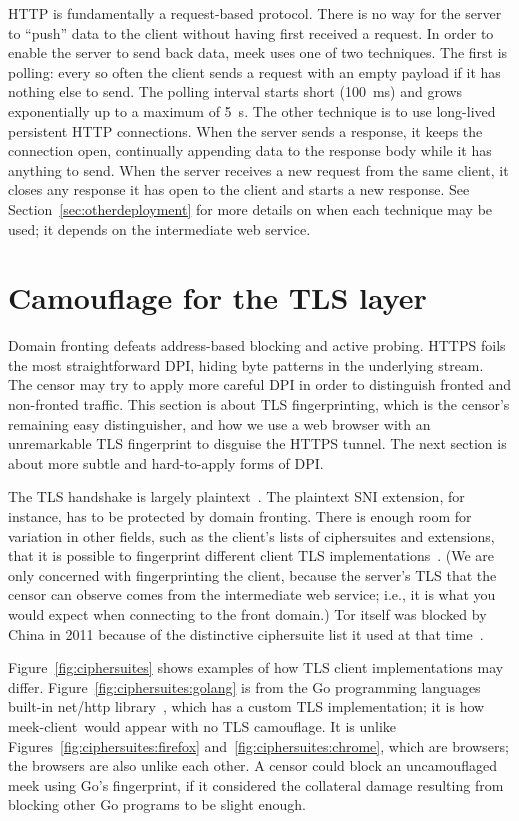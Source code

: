 \documentclass[conference]{IEEEtran}
\def\meekclient{\mbox{meek-client}}
\begin{document}
HTTP is fundamentally a request-based protocol.
There is no way for the server to ``push'' data to the client without
having first received a request.
In order to enable the server to send back data,
meek uses one of two techniques.
The first is polling:
every so often the client sends a request with an empty payload
if it has nothing else to send.
The polling interval starts short (100~ms) and grows exponentially
up to a maximum of 5~s.
The other technique is to use
long-lived persistent HTTP connections.
When the server sends a response, it keeps the connection open,
continually appending data to the response body while it has anything to send.
When the server receives a new request from the same client,
it closes any response it has open to the client and starts a new response.
See Section~\ref{sec:otherdeployment} for more details
on when each technique may be used;
it depends on the intermediate web service.

\section{Camouflage for the TLS layer}
\label{sec:browserextension}

Domain fronting defeats address-based blocking and active probing.
HTTPS foils the most straightforward DPI,
hiding byte patterns in the underlying stream.
The censor may try to apply more careful DPI in order to
distinguish fronted and non-fronted traffic.
This section is about TLS fingerprinting,
which is the censor's remaining easy distinguisher,
and how we use a web browser with an unremarkable TLS fingerprint
to disguise the HTTPS tunnel.
The next section is about more subtle and hard-to-apply forms of DPI.

The TLS handshake is largely plaintext~\cite[Section~7.4]{rfc5246}.
The plaintext SNI extension, for instance, has to be protected by domain fronting.
There is enough room for variation in other fields,
such as the client's lists of ciphersuites and extensions,
that it is possible to fingerprint different client TLS implementations~\cite{ssl-p0f}.
(We are only concerned with fingerprinting the client,
because the server's TLS that the censor can observe
comes from the intermediate web service;
i.e., it is what you would expect when connecting to the front domain.)
Tor itself was blocked by China in 2011
because of the distinctive ciphersuite list it used at that time~\cite{bug4744}.

Figure~\ref{fig:ciphersuites} shows examples of how TLS client
implementations may differ.
Figure~\ref{fig:ciphersuites:golang} is from the Go programming languages
built-in net/http library~\cite{golang-net/http},
which has a custom TLS implementation;
it is how \meekclient\ would appear with no TLS camouflage.
It is unlike Figures~\ref{fig:ciphersuites:firefox} and~\ref{fig:ciphersuites:chrome},
which are browsers; the browsers are also unlike each other.
A censor could block an uncamouflaged meek using Go's fingerprint,
if it considered the collateral damage resulting from blocking other Go programs to be slight enough.
\end{document}
